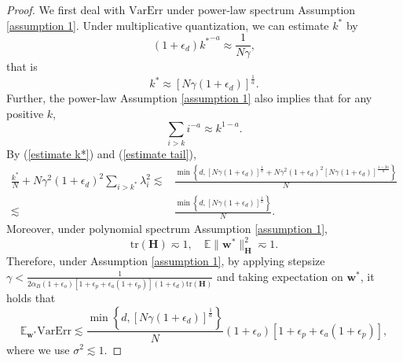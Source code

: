 \documentclass[11pt, letterpaper]{article}
\begin{document}
\begin{proof}
    We first deal with $\mathrm{VarErr}$ under power-law spectrum Assumption \ref{assumption 1}. Under multiplicative quantization, we can estimate $k^*$ by 
    \begin{equation*}
        (1+\epsilon_d){k^*}^{-a}\approx \frac{1}{N\gamma},
    \end{equation*}
    that is
    \begin{equation}
    \label{estimate k*}
        k^*\approx \left[N\gamma (1+\epsilon_d)\right]^{\frac{1}{a}}.
    \end{equation}
    Further, the power-law Assumption \ref{assumption 1} also implies that for any positive $k$,
    \begin{equation}
    \label{estimate tail}
        \sum_{i>k} i^{-a}\approx k^{1-a}.
    \end{equation}
    By (\ref{estimate k*}) and (\ref{estimate tail}),
    \begin{equation*}
        \begin{aligned}
            \frac{k^*}{N}+N\gamma^2(1+\epsilon_d)^2\sum_{i>k^*}\lambda_i^2\lesssim &\frac{\min\left\{d,\left[N\gamma (1+\epsilon_d)\right]^{\frac{1}{a}}+N\gamma^2(1+\epsilon_d)^2\left[N\gamma (1+\epsilon_d)\right]^{\frac{1-2a}{a}}\right\}}{N}\\
            \lesssim&\frac{\min \left\{d,\left[N\gamma (1+\epsilon_d)\right]^{\frac{1}{a}}\right\}}{N}.
        \end{aligned}
    \end{equation*}
    Moreover, under polynomial spectrum Assumption \ref{assumption 1}, 
    \begin{equation*}
        \mathrm{tr}(\mathbf{H})\eqsim 1,\quad \mathbb{E}\|\mathbf{w}^*\|_\mathbf{H}^2 \eqsim 1.
    \end{equation*}
    Therefore, under Assumption \ref{assumption 1}, by applying stepsize $\gamma < \frac{1}{2\alpha_B (1+\epsilon_o)[1+\epsilon_p+\epsilon_a(1+\epsilon_p)](1+\epsilon_d)\mathrm{tr}(\mathbf{H})}$ and taking expectation on $\mathbf{w}^*$, it holds that
    \begin{equation}
        \label{eq: d4}
        \mathbb{E}_{\mathbf{w}^*}\mathrm{VarErr}\lesssim \frac{\min \left\{d,\left[N\gamma (1+\epsilon_d)\right]^{\frac{1}{a}}\right\}}{N}(1+\epsilon_o) [1+\epsilon_p+\epsilon_a(1+\epsilon_p)],
    \end{equation}
    where we use $\sigma^2\lesssim 1$.


\end{proof}
\end{document}
